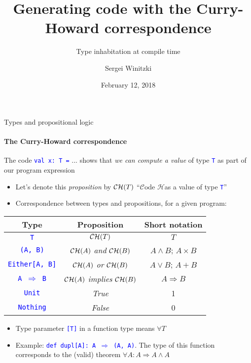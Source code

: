 \documentclass[english]{beamer}
\title[Curry-Howard code generator]{Generating code with the Curry-Howard correspondence}
\subtitle{Type inhabitation at compile time}
\author{Sergei Winitzki}
\date{February 12, 2018}
\institute[SFTTPL]{SF Types, Theorems, and Programming Languages}
\providecommand{\tabularnewline}{\\}
\begin{document}
\frame{\titlepage}
\begin{frame}{Types and propositional logic}


\framesubtitle{The Curry-Howard correspondence}

The code \texttt{\textcolor{blue}{\footnotesize{}val x:\ T =}} ...
shows that \emph{we can compute a value} of type \texttt{\textcolor{blue}{\footnotesize{}T}}
as part of our program expression
\begin{itemize}
\item Let's denote this \emph{proposition} by ${\cal CH}(T)$ \textendash{}
``$\mathcal{C}$ode $\mathcal{H}$as a value of type \texttt{\textcolor{blue}{\footnotesize{}T}}''
\item Correspondence between types and propositions, for a given program:
\end{itemize}
\begin{center}
\begin{tabular}{|c|c|c|}
\hline 
\textbf{Type} &
\textbf{Proposition} &
\textbf{Short notation}\tabularnewline
\hline 
\hline 
\texttt{\textcolor{blue}{\footnotesize{}T}} &
${\cal CH}(T)$ &
$T$\tabularnewline
\hline 
\texttt{\textcolor{blue}{\footnotesize{}(A, B)}} &
${\cal CH}(A)$ \emph{and} ${\cal CH}(B)$ &
$A\wedge B$; $A\times B$\tabularnewline
\hline 
\texttt{\textcolor{blue}{\footnotesize{}Either{[}A, B{]}}} &
${\cal CH}(A)$ \emph{or} ${\cal CH}(B)$ &
$A\vee B$; $A+B$\tabularnewline
\hline 
\texttt{\textcolor{blue}{\footnotesize{}A $\Rightarrow$ B}} &
${\cal CH}(A)$ \emph{implies} ${\cal CH}(B)$ &
$A\Rightarrow B$\tabularnewline
\hline 
\texttt{\textcolor{blue}{\footnotesize{}Unit}} &
\emph{True} &
1\tabularnewline
\hline 
\texttt{\textcolor{blue}{\footnotesize{}Nothing}} &
\emph{False} &
0\tabularnewline
\hline 
\end{tabular}
\par\end{center}
\begin{itemize}
\item Type parameter \texttt{\textcolor{blue}{\footnotesize{}{[}T{]}}} in
a function type means $\forall T$
\item Example: \texttt{\textcolor{blue}{\footnotesize{}def dupl{[}A{]}:\ A
$\Rightarrow$ (A, A)}}. The type of this function corresponds to
the (valid) theorem $\forall A:A\Rightarrow A\wedge A$
\end{itemize}
\end{frame}
\end{document}
